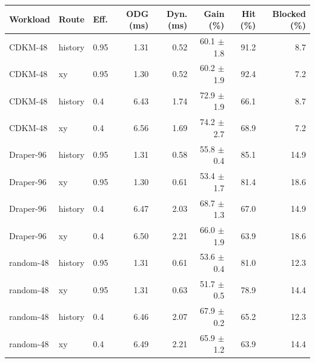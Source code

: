 \begin{tabular}{lllrrrrr}
\toprule
Workload & Route & Eff. & ODG (ms) & Dyn. (ms) & Gain (\%) & Hit (\%) & Blocked (\%) \\
\midrule
CDKM-48 & history & 0.95 & 1.31 & 0.52 & 60.1 $\pm$ 1.8 & 91.2 & 8.7 \\
CDKM-48 & xy & 0.95 & 1.30 & 0.52 & 60.2 $\pm$ 1.9 & 92.4 & 7.2 \\
CDKM-48 & history & 0.4 & 6.43 & 1.74 & 72.9 $\pm$ 1.9 & 66.1 & 8.7 \\
CDKM-48 & xy & 0.4 & 6.56 & 1.69 & 74.2 $\pm$ 2.7 & 68.9 & 7.2 \\
Draper-96 & history & 0.95 & 1.31 & 0.58 & 55.8 $\pm$ 0.4 & 85.1 & 14.9 \\
Draper-96 & xy & 0.95 & 1.30 & 0.61 & 53.4 $\pm$ 1.7 & 81.4 & 18.6 \\
Draper-96 & history & 0.4 & 6.47 & 2.03 & 68.7 $\pm$ 1.3 & 67.0 & 14.9 \\
Draper-96 & xy & 0.4 & 6.50 & 2.21 & 66.0 $\pm$ 1.9 & 63.9 & 18.6 \\
random-48 & history & 0.95 & 1.31 & 0.61 & 53.6 $\pm$ 0.4 & 81.0 & 12.3 \\
random-48 & xy & 0.95 & 1.31 & 0.63 & 51.7 $\pm$ 0.5 & 78.9 & 14.4 \\
random-48 & history & 0.4 & 6.46 & 2.07 & 67.9 $\pm$ 0.2 & 65.2 & 12.3 \\
random-48 & xy & 0.4 & 6.49 & 2.21 & 65.9 $\pm$ 1.2 & 63.9 & 14.4 \\
\bottomrule
\end{tabular}
